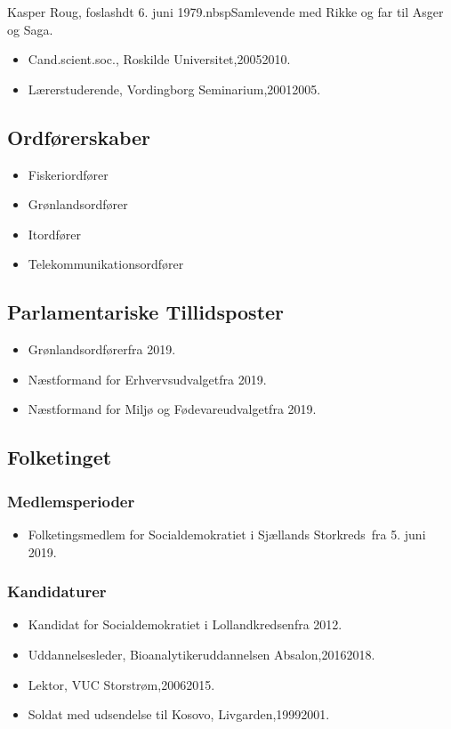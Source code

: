 \documentclass[11pt, a4paper]{awesome-cv}
\begin{document}
\makecvheader[R]
\makelettertitle
\begin{cvletter}
Kasper Roug, foslashdt 6. juni 1979.nbspSamlevende med Rikke og far til Asger og Saga.

\begin{itemize}
\item Cand.scient.soc., Roskilde Universitet,20052010.
\item Lærerstuderende, Vordingborg Seminarium,20012005.
\end{itemize}
\subsection*{Ordførerskaber}
\begin{itemize}
\item Fiskeriordfører
\item Grønlandsordfører
\item Itordfører
\item Telekommunikationsordfører
\end{itemize}
\subsection*{Parlamentariske Tillidsposter}
\begin{itemize}
\item Grønlandsordførerfra 2019.
\item Næstformand for Erhvervsudvalgetfra 2019.
\item Næstformand for Miljø og Fødevareudvalgetfra 2019.
\end{itemize}
\subsection*{Folketinget}
\subsubsection*{Medlemsperioder}
\begin{itemize}
\item Folketingsmedlem for Socialdemokratiet i Sjællands Storkreds fra 5. juni 2019.
\end{itemize}
\subsubsection*{Kandidaturer}
\begin{itemize}
\item Kandidat for Socialdemokratiet i Lollandkredsenfra 2012.
\end{itemize}
\begin{itemize}
\item Uddannelsesleder, Bioanalytikeruddannelsen Absalon,20162018.
\item Lektor, VUC Storstrøm,20062015.
\item Soldat med udsendelse til Kosovo, Livgarden,19992001.
\end{itemize}
\end{cvletter}
\end{document}
